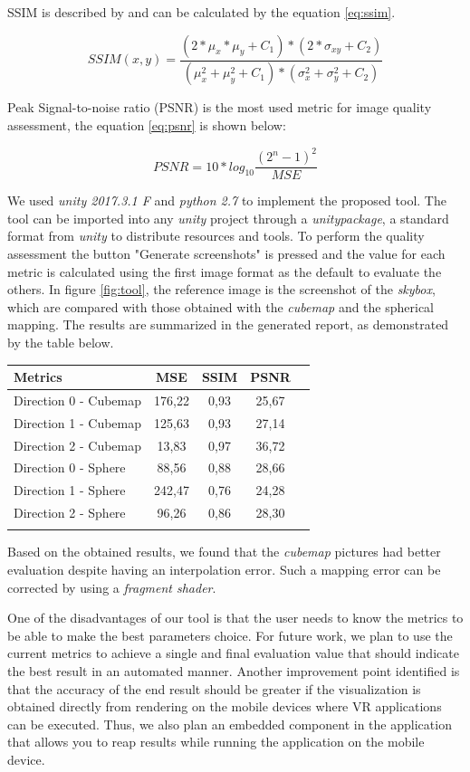 \documentclass[12pt]{article}
\begin{document}
SSIM is described by \cite{wang2004image} and can be calculated by the equation \ref{eq:ssim}.

\begin{equation}
SSIM(x,y)=\frac{(2*\mu_x*\mu_y+C_1)*(2*\sigma_{xy}+C_2)}{(\mu^2_x+\mu^2_y+C_1)*(\sigma^2_x+\sigma^2_y+C_2)}
\label{eq:ssim}
\end{equation}

Peak Signal-to-noise ratio (PSNR) is the most used metric for image quality assessment, the equation \ref{eq:psnr} is shown below:

\begin{equation}
PSNR = 10*log_{10}{\frac{(2^n-1)^2}{MSE}}
\label{eq:psnr}
\end{equation}

We used \textit{unity 2017.3.1 F} and \textit{python 2.7} to implement the proposed tool. The tool can be imported into any \textit{unity} project through a \textit{unitypackage}, a standard format from \textit{unity} to distribute resources and tools. To perform the quality assessment the button "Generate screenshots" is pressed and the value for each metric is calculated using the first image format as the default to evaluate the others. In figure \ref{fig:tool}, the reference image is the screenshot of the \textit{skybox}, which are compared with those obtained with the \textit{cubemap} and the spherical mapping. The results are summarized in the generated report, as demonstrated by the table below.

\begin{tabular}{l*{3}{c}r}
Metrics               & MSE & SSIM & PSNR \\
\hline
Direction 0 - Cubemap & 176,22 & 0,93 & 25,67 \\
Direction 1 - Cubemap & 125,63 & 0,93 & 27,14 \\
Direction 2 - Cubemap & 13,83 & 0,97 & 36,72 \\
Direction 0 - Sphere  & 88,56 & 0,88 & 28,66 \\
Direction 1 - Sphere  & 242,47 & 0,76 & 24,28 \\
Direction 2 - Sphere  & 96,26 & 0,86 & 28,30 \\
\label{tab:metrics_results}
\end{tabular}

Based on the obtained results, we found that the \textit{cubemap} pictures had better evaluation despite having an interpolation error. Such a mapping error can be corrected by using a \textit{fragment shader}. 

One of the disadvantages of our tool is that the user needs to know the metrics to be able to make the best parameters choice. For future work, we plan to use the current metrics to achieve a single and final evaluation value that should indicate the best result in an automated manner. Another improvement point identified is that the accuracy of the end result should be greater if the visualization is obtained directly from rendering on the mobile devices where VR applications can be executed. Thus, we also plan an embedded component in the application that allows you to reap results while running the application on the mobile device.



\end{document}
